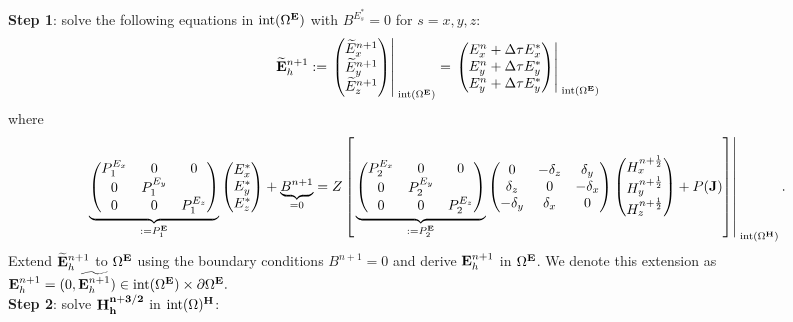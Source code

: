 \documentclass[12pt,reqno]{amsart}
\newcommand{\e}{{\bf E}}
\newcommand{\h}{{\bf H}}
\theoremstyle{definition}
\numberwithin{equation}{section}
\newcommand{\intr}[1]{\mathrm{int}(#1)}
\def\Gw{\Omega}     \def\Gx{\Xi}         \def\Gy{\Psi}
\begin{document}
	{\bf Step 1}: solve the following equations in $\intr{\Gw^{\e}}$ with
	 $B^{E_s^*}=0$ for $s=x,y,z$: \\[2mm]
	$$
	\widetilde{\e}_h^{n+1}:=
	\left.
	\begin{pmatrix}
		\widetilde{E}_x^{n+1}\\
		\widetilde{E}_y^{n+1}\\
		\widetilde{E}_z^{n+1}
	\end{pmatrix}\right|_{\; \intr{\Gw^{\e}}}^{\;}=
\left.
	\begin{pmatrix}
		E_x^n+\Delta \tau E_x^{*}\\
		E_y^n+\Delta \tau E_y^{*}\\
		E_y^n+\Delta \tau E_y^{*}
	\end{pmatrix}\right|_{\; \intr{\Gw^{\e}}}^{\;}
	$$
	where 
	$$
	\underbrace{
	\begin{pmatrix}
		P_1^{E_x} & 0&0 \\
		0 & P_1^{E_y} &\\
		0&0&P_1^{E_z} 
	\end{pmatrix}
}_{:=P_1^\e}
	\begin{pmatrix}
		E_x^{*}\\
		E_y^{*} \\
		E_z^{*}
	\end{pmatrix}+\underbrace{B^{n+1}}_{=0}=Z
\left [ \left.
	\underbrace{
	\begin{pmatrix}
		P_2^{E_x} & 0&0 \\
		0 & P_2^{E_y} &\\
		0&0&P_2^{E_z} 
	\end{pmatrix}
}_{:=P_2^\e}
	\begin{pmatrix}
		0& -\delta_z & \delta _y\\
		\delta_z&0&-\delta_x\\
		-\delta_y&\delta_x&0
	\end{pmatrix}
	\begin{pmatrix}
		H_x^{n+\frac{1}{2}}\\
		H_y^{n+\frac{1}{2}}\\
		H_z^{n+\frac{1}{2}}
	\end{pmatrix}+P({\bf J})\right]\right|_{\; \intr{\Gw^{\h}}}^{\;}.
	$$
	Extend $\widetilde{\e}_h^{n+1}$
to $\Gw^\e$ using the boundary conditions $B^{n+1}=0$ and derive 
$\e_h^{n+1}$ in $\Gw^\e$. 
We denote this extension as $\e_h^{n+1}=(0,\widetilde{\e_h^{n+1}})\in 
\intr{\Gw^\e}\times \partial \Gw^{\e}.
$ 
	\\[1mm]
	{\bf Step 2}: solve $\bf{H}^{n+3/2}_h$ in $\intr\Gw^\h$: \\[2mm]
\end{document}
